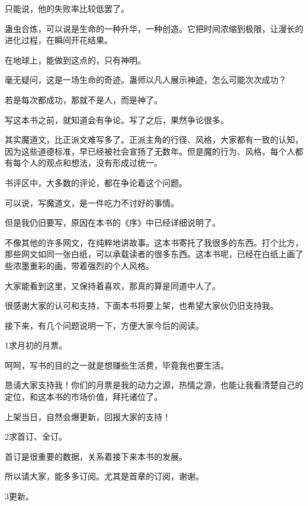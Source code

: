 \begin{this_body}
只能说，他的失败率比较低罢了。

蛊虫合炼，可以说是生命的一种升华，一种创造。它把时间浓缩到极限，让漫长的进化过程，在瞬间开花结果。

在地球上，能做到这点的，只有神明。

毫无疑问，这是一场生命的奇迹。蛊师以凡人展示神迹，怎么可能次次成功？

若是每次都成功，那就不是人，而是神了。

\end{this_body}


\begin{this_body} %

写这本书之前，就知道会有争论。写了之后，果然争论很多。

其实魔道文，比正派文难写多了。正派主角的行径、风格，大家都有一致的认知，因为这些道德标准，早已经被社会宣扬了无数年。但是魔的行为、风格，每个人都有每个人的观点和想法，没有形成过统一。

书评区中，大多数的评论，都在争论着这个问题。

可以说，写魔道文，是一件吃力不讨好的事情。

但是我仍旧要写，原因在本书的《序》中已经详细说明了。

不像其他的许多网文，在纯粹地讲故事。这本书寄托了我很多的东西。打个比方，那些网文如同一张白纸，可以承载读者的很多东西。这本书呢，已经在白纸上画了些浓墨重彩的画，带着强烈的个人风格。

大家能看到这里，又保持着喜欢，那真的算是同道中人了。

很感谢大家的认可和支持，下面本书将要上架，也希望大家伙仍旧支持我。

接下来，有几个问题说明一下，方便大家今后的阅读。

1求月初的月票。

呵呵，写书的目的之一就是想赚些生活费，毕竟我也要生活。

恳请大家支持我！你们的月票是我的动力之源，热情之源，也能让我看清楚自己的定位，和这本书的市场价值，拜托诸位了。

上架当日，自然会爆更新，回报大家的支持！

2求首订、全订。

首订是很重要的数据，关系着接下来本书的发展。

所以请大家，能多多订阅。尤其是首章的订阅，谢谢。

3更新。


\end{this_body}
